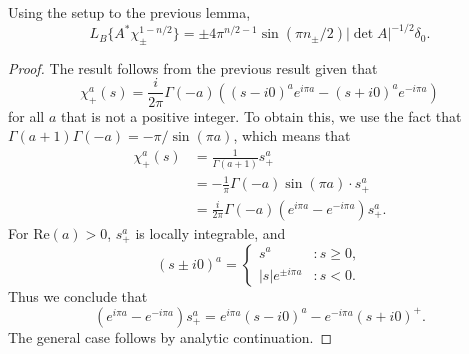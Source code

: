 \begin{corollary}
    Using the setup to the previous lemma,
    \[ L_B \{ A^* \chi_{\pm}^{1-n/2} \} = \pm 4 \pi^{n/2 - 1} \sin (\pi n_{\pm} / 2) |\det A|^{-1/2} \delta_0. \]
\end{corollary}
\begin{proof}
    The result follows from the previous result given that
    \[ \chi_+^a(s) = \frac{i}{2\pi} \Gamma(-a) ((s - i0)^a e^{i \pi a} - (s + i0)^a e^{-i \pi a}) \]
    for all $a$ that is not a positive integer. To obtain this, we use the fact that $\Gamma(a+1) \Gamma(-a) = - \pi / \sin(\pi a)$, which means that
    \begin{align*}
        \chi_+^a(s) &= \frac{1}{\Gamma(a+1)} s_+^a\\
        &= - \frac{1}{\pi} \Gamma(-a) \sin(\pi a) \cdot s_+^a\\
        &= \frac{i}{2 \pi} \Gamma(-a) (e^{i \pi a} - e^{- i \pi a}) s_+^a.
    \end{align*}
    For $\text{Re}(a) > 0$, $s_+^a$ is locally integrable, and
    \[ (s \pm i0)^a = \begin{cases} s^a &: s \geq 0, \\ |s| e^{\pm i \pi a} &: s < 0. \end{cases} \]
    Thus we conclude that
    \[ (e^{i \pi a} - e^{-i \pi a}) s_+^a = e^{i \pi a} (s - i 0)^a - e^{-i \pi a} (s + i0)^+. \]
    The general case follows by analytic continuation.
\end{proof}

%
%
%
%
%
%

